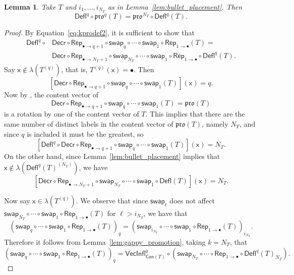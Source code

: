 \documentclass[12pt]{amsart}
\newcommand{\x}{\ensuremath{\mathsf{x}}}
\newtheorem{lemma}[theorem]{Lemma}
\theoremstyle{definition}
\theoremstyle{remark}
\numberwithin{equation}{section}
\newcommand{\pro}{\mathfrak{pro}}
\newcommand{\swap}{\ensuremath{\mathsf{swap}}}
\newcommand{\decr}{\ensuremath{\mathsf{Decr}}}
\newcommand{\rep}{\ensuremath{\mathsf{Rep}}}
\newcommand{\deflate}{\ensuremath{\mathsf{Defl}}}
\newcommand{\inflate}{\ensuremath{\mathsf{VecInfl}}}
\newcommand{\content}{\ensuremath{\mathsf{Con}}}
\begin{document}
\begin{lemma}\label{lem:deflation_commutation}
Take $T$ and $i_1,...,i_{N_T}$ as in Lemma~\ref{lem:bullet_placement}. Then
\begin{equation}\label{eq:deflation_commutation}
\deflate^q \circ \pro^q(T) = \pro^{N_T} \circ \deflate^q(T).
\end{equation}

\end{lemma}
\begin{proof}
By Equation~\ref{eq:kprodef2}, it is sufficient to show that
\begin{align*}
\deflate^q \circ &\decr \circ \rep_{\bullet \rightarrow q+1} \circ \swap_q \circ \cdots \circ \swap_1\circ \rep_{1 \rightarrow \bullet} (T) = \\
 & \decr \circ \rep_{\bullet \rightarrow N_T+1} \circ \swap_{N_T} \circ \cdots \circ \swap_1 \circ \rep_{1 \rightarrow \bullet} \circ \deflate^q (T). 
\end{align*}
Say $\x \not \in \lambda(T^{(q)})$, that is,  $T^{(q)}(\x) = \bullet$.  Then 
\[
[\decr \circ \rep_{\bullet \rightarrow q+1} \circ \swap_q \circ \cdots \circ \swap_1 (T)](\x) = q.
\]
Now by \cite[Lemma~2.1]{DPS}, the content vector of  
\[
\decr \circ \rep_{\bullet \rightarrow q+1} \circ \swap_q \circ \cdots \circ \swap_1 (T) = \pro(T)
\]
 is a rotation by one of the content vector of $T$. This implies that there are the same number of distinct labels in the content vector of $\pro(T)$, namely $N_T$, and since $q$ is included it must be the greatest, so 
 \[
 [\deflate^q \circ \decr \circ \rep_{\bullet \rightarrow q+1} \circ \swap_q \circ \cdots \circ \swap_1 (T)](\x) = N_T.
 \]
  On the other hand, since Lemma~\ref{lem:bullet_placement} implies that $\x \not \in \lambda(\deflate^q(T)^{(N_T)})$, we have
  \[
  [\decr \circ \rep_{\bullet \rightarrow N_T + 1} \circ \swap_{N_T} \circ \cdots \circ \swap_1 \circ \deflate(T)](\x) = N_T.
  \] 

Now say $\x \in \lambda(T^{(q)})$. We observe that since $\swap_\ell$ does not affect $\swap_{N_T} \circ \cdots \circ \swap_1 \circ \rep_{1 \rightarrow \bullet} (T)$ for $\ell > i_{N_T}$, we have that
\[ (\swap_q \circ \cdots \circ \swap_1 \circ \rep_{1 \rightarrow \bullet}( T ))_q = (\swap_{i_{N_T}} \circ \cdots \circ \swap_1 \circ \rep_{1 \rightarrow \bullet}( T ))_{i_{N_T}}.  \]
Therefore it follows from Lemma~\ref{lem:gappy_promotion}, taking $k = N_T$, that 
\[ (\swap_q \circ \cdots \circ \swap_1 \circ \rep_{1 \rightarrow \bullet}( T ))_q = \inflate^q_{\content(T)} \circ (\swap_{N_T} \circ \cdots \circ  \rep_{1 \rightarrow \bullet} \circ \deflate^q(T)_{N_T}). \]


\end{proof}
\end{document}
